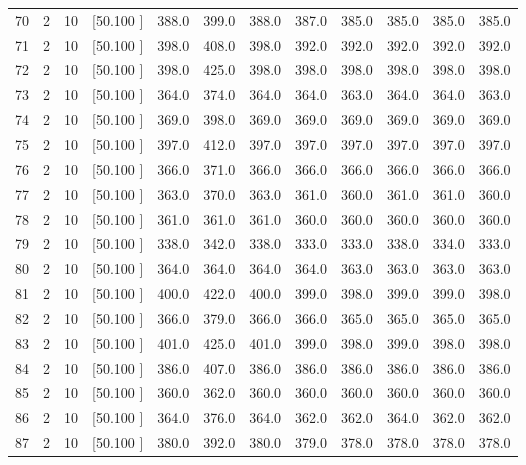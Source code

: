 \documentclass[12pt,a4paper]{article}
\begin{document}
\begin{center}
{\begin{tabular}{r r r r r r r r r r r r}
  70&  2& 10&[50.100    ]&   388.0&   399.0&   388.0&   387.0&   385.0&   385.0&   385.0&   385.0\\[-0.02in]
  71&  2& 10&[50.100    ]&   398.0&   408.0&   398.0&   392.0&   392.0&   392.0&   392.0&   392.0\\[-0.02in]
  72&  2& 10&[50.100    ]&   398.0&   425.0&   398.0&   398.0&   398.0&   398.0&   398.0&   398.0\\[-0.02in]
  73&  2& 10&[50.100    ]&   364.0&   374.0&   364.0&   364.0&   363.0&   364.0&   364.0&   363.0\\[-0.02in]
  74&  2& 10&[50.100    ]&   369.0&   398.0&   369.0&   369.0&   369.0&   369.0&   369.0&   369.0\\[-0.02in]
  75&  2& 10&[50.100    ]&   397.0&   412.0&   397.0&   397.0&   397.0&   397.0&   397.0&   397.0\\[-0.02in]
  76&  2& 10&[50.100    ]&   366.0&   371.0&   366.0&   366.0&   366.0&   366.0&   366.0&   366.0\\[-0.02in]
  77&  2& 10&[50.100    ]&   363.0&   370.0&   363.0&   361.0&   360.0&   361.0&   361.0&   360.0\\[-0.02in]
  78&  2& 10&[50.100    ]&   361.0&   361.0&   361.0&   360.0&   360.0&   360.0&   360.0&   360.0\\[-0.02in]
  79&  2& 10&[50.100    ]&   338.0&   342.0&   338.0&   333.0&   333.0&   338.0&   334.0&   333.0\\[-0.02in]
  80&  2& 10&[50.100    ]&   364.0&   364.0&   364.0&   364.0&   363.0&   363.0&   363.0&   363.0\\[-0.02in]
  81&  2& 10&[50.100    ]&   400.0&   422.0&   400.0&   399.0&   398.0&   399.0&   399.0&   398.0\\[-0.02in]
  82&  2& 10&[50.100    ]&   366.0&   379.0&   366.0&   366.0&   365.0&   365.0&   365.0&   365.0\\[-0.02in]
  83&  2& 10&[50.100    ]&   401.0&   425.0&   401.0&   399.0&   398.0&   399.0&   398.0&   398.0\\[-0.02in]
  84&  2& 10&[50.100    ]&   386.0&   407.0&   386.0&   386.0&   386.0&   386.0&   386.0&   386.0\\[-0.02in]
  85&  2& 10&[50.100    ]&   360.0&   362.0&   360.0&   360.0&   360.0&   360.0&   360.0&   360.0\\[-0.02in]
  86&  2& 10&[50.100    ]&   364.0&   376.0&   364.0&   362.0&   362.0&   364.0&   362.0&   362.0\\[-0.02in]
  87&  2& 10&[50.100    ]&   380.0&   392.0&   380.0&   379.0&   378.0&   378.0&   378.0&   378.0\\[-0.02in]

\end{tabular}}
\end{center}
\end{document}
